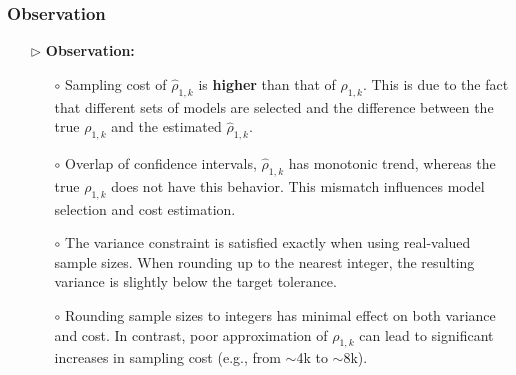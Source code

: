 \documentclass{beamer}
\begin{document}
\begin{frame}[t]
    \frametitle{Observation}
    {\footnotesize 
\begin{itemize}[leftmargin=5pt] 
     \item[$\triangleright$] {\bf Observation:} 
     \begin{itemize}[leftmargin=10pt] 
     \item [$\circ$] Sampling cost of $\widehat \rho_{1,k}$ is {\bf higher}  than that of $\rho_{1,k}$. This is due to the fact that different sets of models are selected and the difference between the true $\rho_{1,k}$ and the estimated $\widehat \rho_{1,k}$.
     \item [$\circ$] Overlap of confidence intervals, $\widehat \rho_{1,k}$ has monotonic trend, whereas the true $\rho_{1,k}$ does not have this behavior. This mismatch influences model selection and cost estimation.
        \item [$\circ$]The variance constraint is satisfied exactly when using real-valued sample sizes. When rounding up to the nearest integer, the resulting variance is slightly below the target tolerance.
        \item [$\circ$] Rounding sample sizes to integers has minimal effect on both variance and cost. In contrast, poor approximation of $\rho_{1,k}$ can lead to significant increases in sampling cost (e.g., from $\sim$4k to $\sim$8k).
     \end{itemize}
\end{itemize}
 }


\end{frame}
\end{document}
